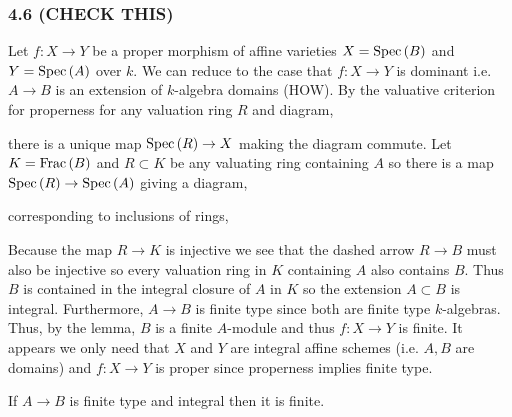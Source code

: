 \documentclass[12pt]{article}
\begin{document}
\subsubsection{4.6 (CHECK THIS)}

Let $f : X \to Y$ be a proper morphism of affine varieties $X = \mathrm{Spec}\left( B \right)$ and $Y = \mathrm{Spec}\left( A \right)$ over $k$. We can reduce to the case that $f : X \to Y$ is dominant i.e. $A \to B$ is an extension of $k$-algebra domains (HOW). By the valuative criterion for properness for any valuation ring $R$ and diagram,
\begin{center}
\end{center}
there is a unique map $\mathrm{Spec}\left( R \right) \to X$ making the diagram commute. Let $K = \mathrm{Frac}\left(B\right)$ and $R \subset K$ be any valuating ring containing $A$ so there is a map $\mathrm{Spec}\left( R \right) \to \mathrm{Spec}\left( A \right)$ giving a diagram,
\begin{center}
\end{center}
corresponding to inclusions of rings,
\begin{center}
\end{center}
Because the map $R \to K$ is injective we see that the dashed arrow $R \to B$ must also be injective so every valuation ring in $K$ containing $A$ also contains $B$. Thus $B$ is contained in the integral closure of $A$ in $K$ so the extension $A \subset B$ is integral. Furthermore, $A \to B$ is finite type since both are finite type $k$-algebras. Thus, by the lemma, $B$ is a finite $A$-module and thus $f : X \to Y$ is finite. It appears we only need that $X$ and $Y$ are integral affine schemes (i.e. $A, B$ are domains) and $f : X \to Y$ is proper since properness implies finite type.

\begin{lemma}
If $A \to B$ is finite type and integral then it is finite.
\end{lemma}
\end{document}
